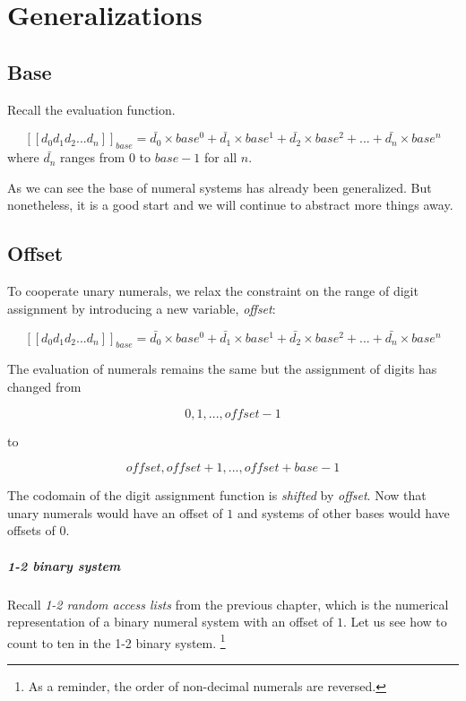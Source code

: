 \documentclass[\main/thesis.tex]{subfiles}
\begin{document}
\chapter{Generalizations}\label{generalizations}


\section{Base}

Recall the evaluation function.

$$
    [\![d_0d_1d_2...d_n]\!]_{base}
    =
    \bar{d_0}\times base^0 + \bar{d_1}\times base^1 + \bar{d_2}\times base^2 + ... + \bar{d_n}\times base^n
$$
%
where $ \bar{d_n} $ ranges from $ 0 $ to $ base - 1 $ for all $ n $.

As we can see the base of numeral systems has already been generalized.
But nonetheless, it is a good start and we will continue to abstract more things
away.

\section{Offset}

To cooperate unary numerals, we relax the constraint on the range of digit
assignment by introducing a new variable, \textit{offset}:

$$
    [\![d_0d_1d_2...d_n]\!]_{base}
    =
    \bar{d_0}\times base^0 + \bar{d_1}\times base^1 + \bar{d_2}\times base^2 + ... + \bar{d_n}\times base^n
$$

The evaluation of numerals remains the same but the assignment of digits has changed from

$$
    { 0, 1, ..., \mathit{offset} - 1 }
$$

to

$$
    { \mathit{offset}, \mathit{offset} + 1, ..., \mathit{offset} + \mathit{base} - 1 }
$$

The codomain of the digit assignment function is \textit{shifted} by \textit{offset}.
Now that unary numerals would have an offset of $ 1 $
and systems of other bases would have offsets of $ 0 $.


\paragraph{1-2 binary system}
Recall \textit{1-2 random access lists} from the previous chapter,
which is the numerical representation of a binary numeral system with an offset
of $ 1 $.
Let us see how to count to ten in the 1-2 binary system.
\footnote{As a reminder, the order of non-decimal numerals are reversed.}
\end{document}
